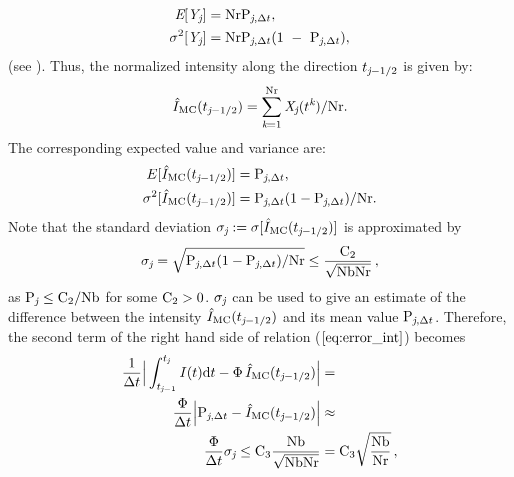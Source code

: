 \begin{subequations}
\begin{align}
\textit{E}[\textit{Y}_{\textit{j}}] &= \textrm{Nr}\textrm{P}_{\textit{j}, \Delta t}, \\ \sigma^2[\textit{Y}_{\textit{j}}] &= \textrm{Nr}\textrm{P}_{\textit{j}, \Delta t}(1~-~\textrm{P}_{\textit{j}, \Delta t}),\end{align}
\end{subequations}
(see \cite{zolotarev1997modern, rubinstein2016simulation}).
Thus, the normalized intensity along the direction $t_{\textit{j}-1/2}$ is given by:
\begin{equation}\hat{I}_{\textrm{MC}}(t_{\textit{j}-1/2}) = \sum_{\textit{k}=1}^{\textrm{Nr}}\textit{X}_{\textit{j}}(t^{\textit{k}})/\textrm{Nr}.\end{equation}
The corresponding expected value and variance are:
\begin{subequations}
\begin{align}E[\hat{I}_{\textrm{MC}}(t_{\textit{j}-1/2})]&=\textrm{P}_{\textit{j}, \Delta t},\\ \label{eq:variance_I}
\sigma^2[\hat{I}_{\textrm{MC}}(t_{\textit{j}-1/2})] &= \textrm{P}_{\textit{j}, \Delta t}(1-\textrm{P}_{\textit{j}, \Delta t})/\textrm{Nr}.
\end{align}
\end{subequations}
Note that the standard deviation $\sigma_{\textit{j}}:=\sigma[\hat{I}_{\textrm{MC}}(t_{\textit{j}-1/2})]$ is approximated by
\begin{equation}\label{sigma}
\sigma_{\textit{j}}= \sqrt{\textrm{P}_{\textit{j}, \Delta t}(1-\textrm{P}_{\textit{j}, \Delta t})/\textrm{Nr}}\leq\frac{\textrm{C}_2}{\sqrt{\textrm{Nb}\textrm{Nr}}}\,, \end{equation}
 as $\textrm{P}_{\textit{j}}\leq \textrm{C}_{2}/\textrm{Nb}$ for some $\textrm{C}_{2}>0$. $\sigma_{\textit{j}}$ can be used to give an estimate of the difference between the intensity $\hat{I}_{\textrm{MC}}(t_{\textit{j}-1/2})$ and its mean value $\textrm{P}_{\textit{j}, \Delta t}$.
Therefore, the second term of the right hand side of relation ($\ref{eq:error_int}$) becomes
\begin{equation}\begin{aligned}
\frac{1}{\Delta t}\Big|\int_{t_{\textit{j}-1}}^{t_{\textit{j}}} I(t)\textrm{d}t -
\Phi\, \hat{I}_{\textrm{MC}}(t_{\textit{j}-1/2})\Big| &=  \\
\frac{\Phi}{\Delta t}\Big|\textrm{P}_{\textit{j}, \Delta t} -\hat{I}_{\textrm{MC}}(t_{\textit{j}-1/2})\Big| &\approx  \\
  \frac{\Phi}{\Delta t}
\sigma_{\textit{j}}\leq\textrm{C}_3\frac{\textrm{Nb}}{\sqrt{\textrm{Nb}\textrm{Nr}}} & = \textrm{C}_3\sqrt{\frac{\textrm{Nb}}{\textrm{Nr}}}\,,
\end{aligned}
\end{equation}
